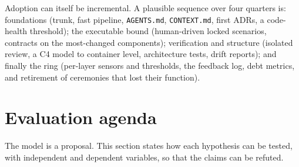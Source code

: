\documentclass[11pt]{article}
\begin{document}
Adoption can itself be incremental. A plausible sequence over four quarters is: foundations (trunk, fast pipeline, \texttt{AGENTS.md}, \texttt{CONTEXT.md}, first ADRs, a code-health threshold); the executable bound (human-driven locked scenarios, contracts on the most-changed components); verification and structure (isolated review, a C4 model to container level, architecture tests, drift reports); and finally the ring (per-layer sensors and thresholds, the feedback log, debt metrics, and retirement of ceremonies that lost their function).

\section{Evaluation agenda}

The model is a proposal. This section states how each hypothesis can be tested, with independent and dependent variables, so that the claims can be refuted.
\end{document}
